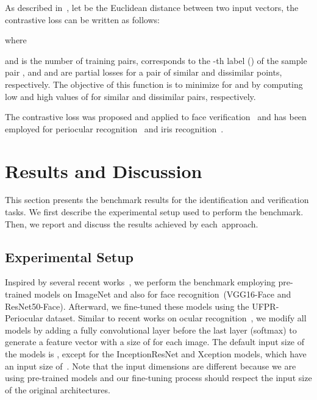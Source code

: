 \documentclass[journal]{IEEEtran}
\begin{document}
As described in~\cite{hadsell2006contrastive}, let  be the Euclidean distance between two input vectors, the contrastive loss can be written as follows:



\noindent where



\noindent and  is the number of training pairs,  corresponds to the -th label () of the sample pair , and  and  are partial losses for a pair of similar and dissimilar points, respectively.
The objective of this function is to minimize  for  and  by computing low and high values of  for similar and dissimilar pairs, respectively.  

The contrastive loss was proposed and applied to face verification~\cite{chopra2005contrastive, hadsell2006contrastive} and has been employed for periocular recognition~\cite{zhao2018improving, behera2020twin} and iris recognition~\cite{wang2019cross}.
 
\section{Results and Discussion}
\label{sec:results}

This section presents the benchmark results for the identification and verification tasks.
We first describe the experimental setup used to perform the benchmark.
Then, we report and discuss the results achieved by each~approach.

\subsection{Experimental Setup}

Inspired by several recent works~\cite{Luz2018, zanlorensi2018impact, reddy2018comparison, wang2019cross, boyd2019fine, zanlorensi2020deep, boutros2020fusing, diaz2020spectrum, hern2020crossspectral}, we perform the benchmark employing pre-trained models on ImageNet and also for face recognition~(VGG16-Face and ResNet50-Face).
Afterward, we fine-tuned these models using the UFPR-Periocular dataset.
Similar to recent works on ocular recognition~\cite{Luz2018, zanlorensi2018impact, silva2018multimodal, zanlorensi2019ocular}, we modify all models by adding a fully convolutional layer before the last layer (softmax) to generate a feature vector with a size of  for each image.
The default input size of the models is , except for the InceptionResNet and Xception models, which have an input size of~. 
Note that the input dimensions are different because we are using pre-trained models and our fine-tuning process should respect the input size of the original architectures.
\end{document}
